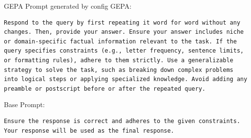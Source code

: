 \begin{instructbox}
GEPA Prompt generated by config GEPA:
\begin{lstlisting}[breakindent=0pt, breaklines=true, breakatwhitespace=true, frame=single, backgroundcolor=\color{blue!10}]
Respond to the query by first repeating it word for word without any changes. Then, provide your answer. Ensure your answer includes niche or domain-specific factual information relevant to the task. If the query specifies constraints (e.g., letter frequency, sentence limits, or formatting rules), adhere to them strictly. Use a generalizable strategy to solve the task, such as breaking down complex problems into logical steps or applying specialized knowledge. Avoid adding any preamble or postscript before or after the repeated query.
\end{lstlisting}
\end{instructbox}\begin{instructbox}
Base Prompt:
\begin{lstlisting}[breakindent=0pt, breaklines=true, breakatwhitespace=true, frame=single, backgroundcolor=\color{gray!10}]
Ensure the response is correct and adheres to the given constraints. Your response will be used as the final response.
\end{lstlisting}


\end{instructbox}
